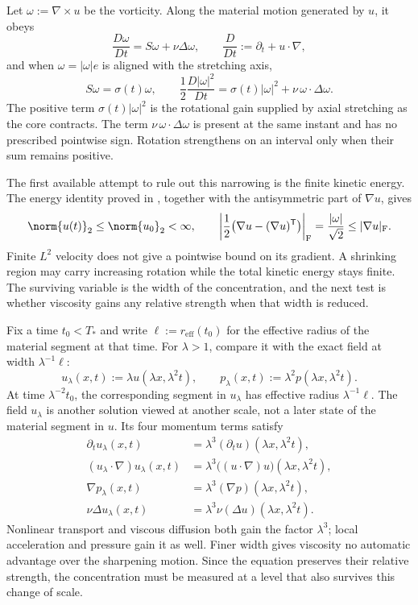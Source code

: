 Let \(\omega:=\nabla\times u\) be the vorticity. Along the material motion generated by \(u\), it obeys
\[
  \frac{D\omega}{Dt}
  =
  S\omega+\nu\Delta\omega,
  \qquad
  \frac{D}{Dt}
  :=
  \partial_t+u\cdot\nabla,
\]
and when \(\omega=|\omega|e\) is aligned with the stretching axis,
\[
  S\omega
  =
  \sigma(t)\omega,
  \qquad
  \frac12\frac{D|\omega|^2}{Dt}
  =
  \sigma(t)|\omega|^2
  +
  \nu\,\omega\cdot\Delta\omega.
\]
The positive term \(\sigma(t)|\omega|^2\) is the rotational gain supplied by axial stretching as the core contracts. The term \(\nu\,\omega\cdot\Delta\omega\) is present at the same instant and has no prescribed pointwise sign. Rotation strengthens on an interval only when their sum remains positive.

The first available attempt to rule out this narrowing is the finite kinetic energy. The energy identity proved in , together with the antisymmetric part of \(\nabla u\), gives
\[
  \norm{u(t)}_2
  \leq
  \norm{u_0}_2
  <\infty,
  \qquad
  \left|\frac12\bigl(\nabla u-(\nabla u)^{\mathsf T}\bigr)\right|_{\mathrm F}
  =
  \frac{|\omega|}{\sqrt2}
  \leq
  |\nabla u|_{\mathrm F}.
\]
Finite \(L^2\) velocity does not give a pointwise bound on its gradient. A shrinking region may carry increasing rotation while the total kinetic energy stays finite. The surviving variable is the width of the concentration, and the next test is whether viscosity gains any relative strength when that width is reduced.


Fix a time \(t_0<T_*\) and write \(\ell:=r_{\mathrm{eff}}(t_0)\) for the effective radius of the material segment at that time. For \(\lambda>1\), compare it with the exact \NavierStokes{} field at width \(\lambda^{-1}\ell\):
\[
  u_\lambda(x,t)
  :=
  \lambda u(\lambda x,\lambda^2t),
  \qquad
  p_\lambda(x,t)
  :=
  \lambda^2p(\lambda x,\lambda^2t).
\]
At time \(\lambda^{-2}t_0\), the corresponding segment in \(u_\lambda\) has effective radius \(\lambda^{-1}\ell\). The field \(u_\lambda\) is another solution viewed at another scale, not a later state of the material segment in \(u\). Its four momentum terms satisfy
\[
\begin{aligned}
  \partial_tu_\lambda(x,t)
  &=
  \lambda^3(\partial_tu)(\lambda x,\lambda^2t),
  \\
  (u_\lambda\cdot\nabla)u_\lambda(x,t)
  &=
  \lambda^3\bigl((u\cdot\nabla)u\bigr)(\lambda x,\lambda^2t),
  \\
  \nabla p_\lambda(x,t)
  &=
  \lambda^3(\nabla p)(\lambda x,\lambda^2t),
  \\
  \nu\Delta u_\lambda(x,t)
  &=
  \lambda^3\nu(\Delta u)(\lambda x,\lambda^2t).
\end{aligned}
\]
Nonlinear transport and viscous diffusion both gain the factor \(\lambda^3\); local acceleration and pressure gain it as well. Finer width gives viscosity no automatic advantage over the sharpening motion. Since the equation preserves their relative strength, the concentration must be measured at a level that also survives this change of scale.

